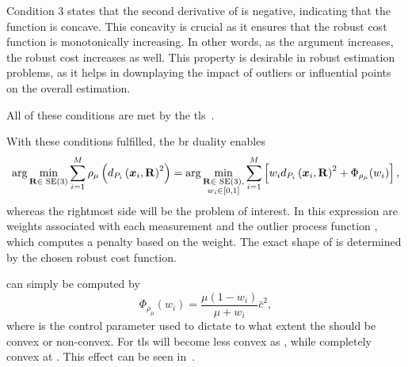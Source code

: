Condition 3 states that the second derivative of  is negative, indicating that the function  is concave. This concavity is crucial as it ensures that the robust cost function \mvar{\rho(\cdot)} is monotonically increasing. In other words, as the argument  increases, the robust cost increases as well. This property is desirable in robust estimation problems, as it helps in downplaying the impact of outliers or influential points on the overall estimation. \medskip

All of these conditions are met by the \gls{tls}~\cite{graduated-non-convexity-for-robust-spatial-perception:-from-non-minimal-solvers-to-global-outlier-rejection}.\medskip

With these conditions fulfilled, the \gls{br} duality enables
%
\begin{equation}\label{eq:br-result}
	\arg \min_{\bm{\mathrm{R}}\in\text{ SE} (3)} \sum^M_{i=1} \rho_\mu \left(d_{P_i}\left( \bm{x}_i,\bm{\mathrm{R}} \right)^{2}\right) = 
	\arg \min_{\substack{\bm{\mathrm{R}}\in\text{ SE} (3),\\ w_i\in [0,1]}} \sum^M_{i=1} \left[ w_i d_{P_i}\left( \bm{x}_i,\bm{\mathrm{R}} \right)^{2} + \Phi_{\rho_\mu}(w_i)\right],
\end{equation}
whereas the rightmost side will be the problem of interest. In this expression  are weights associated with each measurement  and the outlier process function , which computes a penalty based on the weight. The exact shape of  is determined by the chosen robust cost function. \medskip

 can simply be computed by
%
\begin{equation}
	\Phi_{\rho_\mu}(w_i) = \frac{\mu(1-w_i)}{\mu+w_i}\bar{c}^2,
\end{equation}
where \mvar{\mu} is the control parameter used to dictate to what extent the  should be convex or non-convex. For \gls{tls}  will become less convex as \mvar{\mu\rightarrow \infty}, while completely convex at . This effect can be seen in~.

